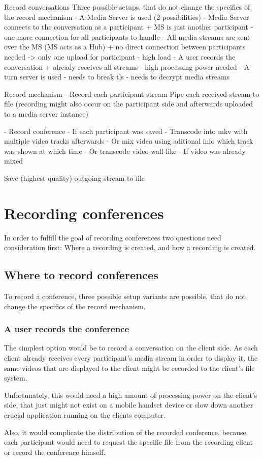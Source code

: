 \documentclass[../../../thesis.tex]{subfiles}
\begin{document}
\comment
Record conversations
Three possible setups, that do not change the specifics of the record mechanism
	- A Media Server is used (2 possibilities)
		- Media Server connects to the conversation as a participant
			+ MS is just another  participant
			- one more connection for all participants to handle
		- All media streams are sent over the MS (MS acts as a Hub)
			+ no direct connection between participants needed -> only one upload for participant
			- high load
	- A user records the conversation
		+ already receives all streams
		- high processing power needed
	- A turn server is used
		- needs to break tls
		- needs to decrypt media streams

Record mechanism
	- Record each participant stream
		Pipe each received stream to file
		(recording might also occur on the participant side and afterwards uploaded to a media server instance)
			
	- Record conference
		- If each participant was saved
			- Transcode into mkv with multiple video tracks afterwards
			- Or mix video using aditional info
				which track was shown at which time
			- Or transcode video-wall-like
		- If video was already mixed

Save (highest quality) outgoing stream to file
\endcomment


\section{Recording conferences}
In order to fulfill the goal of recording conferences two questions need consideration first: Where a recording is created, and how a recording is created.

\subsection{Where to record conferences}
To record a conference, three possible setup variants are possible, that do not change the specifics of the record mechanism.

\subsubsection{A user records the conference}
The simplest option would be to record a conversation on the client side. As each client already receives every participant's media stream in order to display it, the same videos that are displayed to the client might be recorded to the client's file system.\par
Unfortunately, this would need a high amount of processing power on the client's side, that just might not exist on a mobile handset device or slow down another crucial application running on the clients computer.\par
Also, it would complicate the distribution of the recorded conference, because each participant would need to request the specific file from the recording client or record the conference himself.
\end{document}
